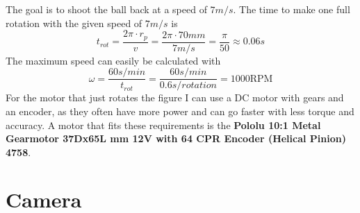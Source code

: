 The goal is to shoot the ball back at a speed of $7m/s$.
The time to make one full rotation with the given speed of $7m/s$ is
\begin{equation}
    \label{eq:time}
    t_{rot} = \frac{2\pi\cdot r_p}{v} = \frac{2\pi\cdot 70mm}{7m/s} = \frac{\pi}{50} \approx 0.06s
\end{equation}
The maximum speed can easily be calculated with
\begin{equation}
    \label{eq:max_speed}
    \omega = \frac{60s/min}{t_{rot}} = \frac{60s/min}{0.6s/rotation} = 1000\text{RPM}
\end{equation}
For the motor that just rotates the figure I can use a DC motor with gears and an encoder, as they often have more power and can go faster with less torque and accuracy.
A motor that fits these requirements is the \textbf{Pololu 10:1 Metal Gearmotor 37Dx65L mm 12V with 64 CPR Encoder (Helical Pinion) 4758}\autocite{pololu-dc}.


\section{Camera}\label{sec:camera}

